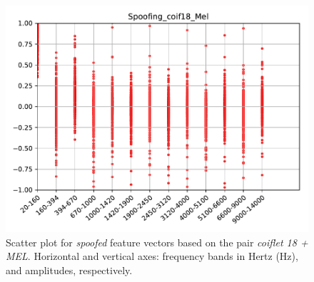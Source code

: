 		\begin{figure}[H]
			\centering
			\includegraphics[scale=.7]{images/results/barkVersusMel/Spoofing_coif18_Mel.pdf}
			\caption{Scatter plot for \textit{spoofed} feature vectors  based on the pair \textit{coiflet 18 + MEL}. Horizontal and vertical axes: frequency bands in Hertz (Hz), and amplitudes, respectively.}
			\label{fig:spoofingcoif18mel}
		\end{figure}